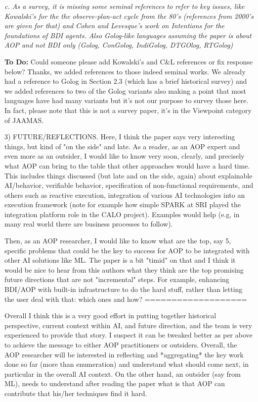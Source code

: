 \documentclass[12pt]{article}
\newenvironment{reviews}{\bigskip\itshape}{\upshape\bigskip}
\newenvironment{response}{\bigskip\normalfont}{\bigskip}
\newcommand{\tbd}[1]{\textsf{\textbf{To Do:} #1}}
\begin{document}
\begin{reviews}
c. As a survey, it is missing some seminal references to refer to key issues, like Kowalski's for the the observe-plan-act cycle from the 80's (references from 2000's are given for that) and Cohen and Levesque's work on Intentions for the foundations of BDI agents. Also Golog-like languages assuming the paper is about AOP and not BDI only (Golog, ConGolog, IndiGolog, DTGOlog, RTGolog)

\begin{response}
\tbd{Could someone please add Kowalski's and C\&L references or fix response below?}
Thanks, we added references to those indeed seminal works. We already had a reference to Golog in Section 2.3 (which has a brief historical survey) and we added references to two of the Golog variants also making a point that most languages have had many variants but it's not our purpose to survey those here. In fact, please note that this is not a survey paper, it's in the Viewpoint category of JAAMAS.
\end{response}

3) FUTURE/REFLECTIONS. Here, I think the paper says very interesting things, but kind of "on the side" and late. As a reader, as an AOP expert and even more as an outsider, I would like to know very soon,  clearly, and precisely what AOP can bring to the table that other approaches would have a hard time. This includes things discussed (but late and on the side, again) about explainable AI/behavior, verifiable behavior, specification of non-functional requirements, and others such as reactive execution, integration of various AI technologies into an execution framework (note for example how simple SPARK at SRI played the integration platform role in the CALO project). Examples would help (e.g, in many real world there are business processes to follow).

Then, as an AOP researcher, I would like to know what are the top, say 5, specific problems that could be the key to success for AOP to be integrated with other AI solutions like ML. The paper is a bit "timid" on that and I think it would be nice to hear from this authors what they think are the top promising future directions that are not "incremental" steps. For example, enhancing BDI/AOP with built-in infrastructure to do the hard stuff, rather than letting the user deal with that: which ones and how?
===================


Overall I think this is a very good effort in putting together historical perspective, current context within AI, and future direction, and the team is very experienced to provide that story. I suspect it can be tweaked better as per above to achieve the message to either AOP practitioners or outsiders. Overall, the AOP researcher will be interested in reflecting and *aggregating* the key work done so far (more than enumeration) and understand what should come next, in particular in the overall AI context. On the other hand, an outsider (say from ML), needs to understand after reading the paper what is that AOP can contribute that his/her techniques find it hard.



\end{reviews}
\end{document}
